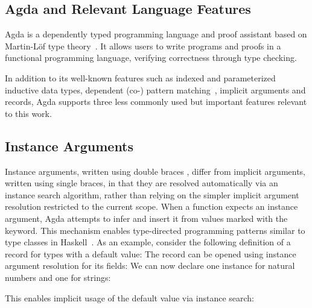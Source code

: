 \documentclass[screen,nonacm]{acmart}
\begin{document}
\subsection{Agda and Relevant Language Features}\label{sec:pre-agd}
Agda is a dependently typed programming language and proof assistant based on
Martin-Löf type theory~\cite{MARTINLOF197573}. It allows users to write
programs and proofs in a functional programming language, verifying correctness
through type checking.

In addition to its well-known features such as indexed and parameterized
inductive data types, dependent (co-) pattern matching~\cite{10.1145/3236770},
implicit arguments and records, Agda supports three less commonly used but
important features relevant to this work.

\subsection*{Instance Arguments}
Instance arguments, written using double braces \AgdaSymbol{{{\dots}}}, differ
from implicit arguments, written using single braces, in that they are resolved
automatically via an instance search algorithm, rather than relying on the
simpler implicit argument resolution restricted to the current scope. When a
function expects an instance argument, Agda attempts to infer and insert it
from values marked with the  keyword. This mechanism
enables type-directed programming patterns similar to type classes in
Haskell~\cite{10.1145/75277.75283}. As an example, consider the following
definition of a record for types with a default value: \EDefault{}The record
can be opened using instance argument resolution for its fields:
\EDefFields{}We can now declare one instance for natural numbers and one for
strings:

\noindent\begin{minipage}[t]{0.48\linewidth}
      \raggedright{}
      \EDefInst{}
\end{minipage}
\begin{minipage}[t]{0.48\linewidth}
      \raggedright{}
      \EDefInstS{}
\end{minipage}

\noindent This enables implicit usage of the default value via instance
search:

\noindent \begin{minipage}[t]{0.48\linewidth}
      \raggedright{}
      \EDefEx{}
\end{minipage}
\begin{minipage}[t]{0.48\linewidth}
      \raggedright{}
      \EDefExS{}
\end{minipage}
\end{document}
